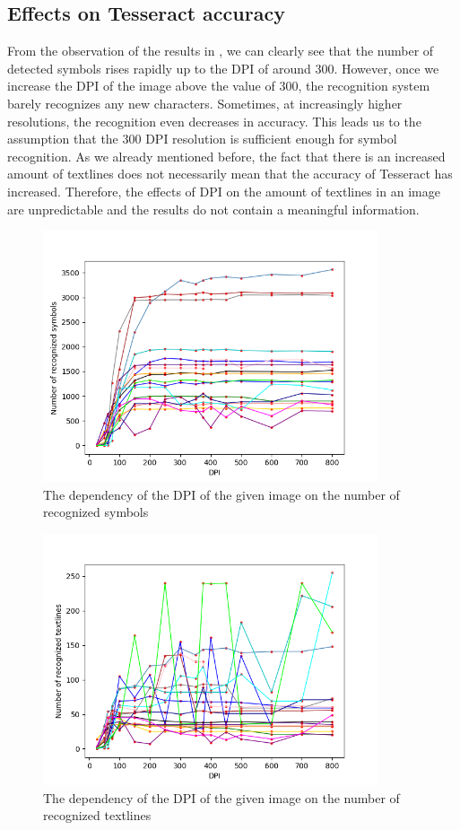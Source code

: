 \subsection{Effects on Tesseract accuracy}

From the observation of the results in , we can clearly see that the number of detected symbols rises rapidly up to the DPI of around 300. However, once we increase the DPI of the image above the value of 300, the recognition system barely recognizes any new characters. Sometimes, at increasingly higher resolutions, the recognition even decreases in accuracy. This leads us to the assumption that the 300 DPI resolution is sufficient enough for symbol recognition. As we already mentioned before, the fact that there is an increased amount of textlines does not necessarily mean that the accuracy of Tesseract has increased. Therefore, the effects of DPI on the amount of textlines in an image are unpredictable and the results  do not contain a meaningful information.

\begin{figure}
\centering
\includegraphics[height=20em]{img/results/dpiSymbols.png}
\caption{The dependency of the DPI of the given image on the number of recognized symbols}
\label{fig:dpiSpeed}
\end{figure}

\begin{figure}
\centering
\includegraphics[height=20em]{img/results/dpiTextlines.png}
\caption{The dependency of the DPI of the given image on the number of recognized textlines}
\label{fig:dpiSpeed}
\end{figure}


